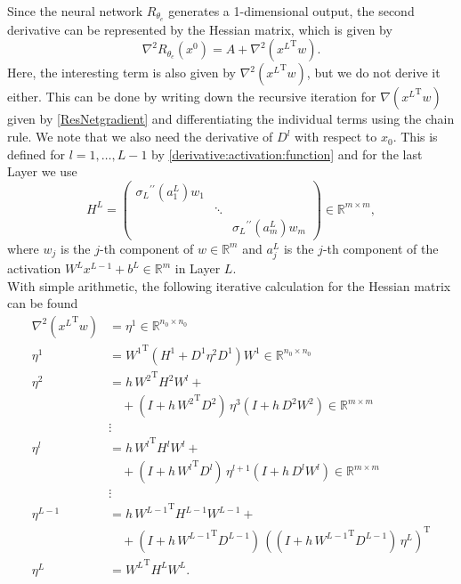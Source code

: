 Since the neural network $R_{\theta_e}$ generates a 1-dimensional output, the second derivative can be represented by the Hessian matrix, which is given by 
\begin{equation*}
    \nabla^2 R_{\theta_e}(x^0) = A + \nabla^2 \left( {x^{L}}^{\mathrm{T}} w \right). 
\end{equation*}
Here, the interesting term is also given by $\nabla^2 \left( {x^{L}}^{\mathrm{T}} w \right)$, but we do not derive it either. This can be done by writing down the recursive iteration for $\nabla \left( {x^{L}}^{\mathrm{T}} w \right)$ given by \cref{ResNetgradient} and differentiating the individual terms using the chain rule. We note that we also need the derivative of $D^l$ with respect to $x_0$. This is defined for $l = 1, \ldots, L-1$ by \cref{derivative:activation:function} and for the last Layer we use 
\begin{equation*}
    H^{L} = \begin{pmatrix} {\sigma_{L}}^{\prime \prime} \left( a^{L}_1 \right) w_1 & & \\ & \ddots & \\ & & {\sigma_{L}}^{\prime \prime} \left( a^{L}_{m} \right) w_{m} \end{pmatrix} \in \mathbb{R}^{m \times m},
\end{equation*}
where $w_{j}$ is the $j$-th component of $w \in \mathbb{R}^m$ and $a^{L}_j$ is the $j$-th component of the activation $W^L x^{L-1} + b^L \in \mathbb{R}^m$ in Layer $L$. \\
With simple arithmetic, the following iterative calculation for the Hessian matrix can be found
\begin{align*}
    \nabla^2 \left( {x^{L}}^{\mathrm{T}} w \right) & = \eta^{1} \in \mathbb{R}^{n_0 \times n_0}  \\
    \eta^{1} & = {W^{1}}^{\mathrm{T}} \left( H^{1} + D^{1} \eta^{2} D^{1} \right) W^{1} \in \mathbb{R}^{n_0 \times n_0} \\
    \eta^{2} & = h \, {W^{2}}^{\mathrm{T}} H^2 W^{l} + \\
    & \quad + \left( I + h \, {W^{2}}^{\mathrm{T}} D^{2} \right) \, \eta^{3}  \left( I + h \,  D^{2} {W^{2}} \right) \in \mathbb{R}^{m \times m}\\ 
    &\vdots\\
    \eta^{l} & = h \, {W^{l}}^{\mathrm{T}} H^{l} W^{l} + \\
    & \quad + \left( I + h \, {W^{l}}^{\mathrm{T}} D^{l} \right) \, \eta^{l+1}  \left( I + h \,  D^{l} {W^{l}} \right) \in \mathbb{R}^{m \times m} \\ 
    &\vdots\\
    \eta^{L-1} & = h \, {W^{L-1}}^{\mathrm{T}} H^{L-1} W^{L-1} + \\
    & \quad + \left( I + h \, {W^{L-1}}^{\mathrm{T}} D^{L-1} \right) \, \left( \left( I + h \, {W^{L-1}}^{\mathrm{T}} D^{L-1} \right) \, \eta^{L} \right)^{\mathrm{T}} \\
    \eta^{L} &  = {W^{L}}^{\mathrm{T}} H^{L} W^{L}.
\end{align*}


